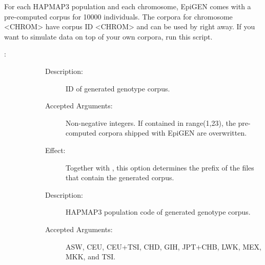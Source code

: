 \documentclass[a4paper,10pt,english]{sphinxhowto}
\begin{document}
For each HAPMAP3 population and each chromosome, EpiGEN comes with a pre-computed corpus for 10000 individuals.
The corpora for chromosome \textless{}CHROM\textgreater{} have corpus ID \textless{}CHROM\textgreater{} and can be used by  right away.
If you want to simulate data on top of your own corpora, run this script.

:

\begin{sphinxVerbatim}[commandchars=\\\{\}]
  \PYG{p}{[} \PYG{p}{]} \PYG{p}{[} \PYG{p}{]}
\end{sphinxVerbatim}
\begin{description}
\item[{}] \leavevmode\begin{description}
\item[{}] \leavevmode\begin{description}
\item[{Description:}] \leavevmode
ID of generated genotype corpus.

\item[{Accepted Arguments:}] \leavevmode
Non-negative integers. If contained in range(1,23), the pre-computed corpora shipped with EpiGEN are overwritten.

\item[{Effect:}] \leavevmode
Together with , this option determines the prefix  of the files
that contain the generated corpus.

\end{description}

\item[{}] \leavevmode\begin{description}
\item[{Description:}] \leavevmode
HAPMAP3 population code of generated genotype corpus.

\item[{Accepted Arguments:}] \leavevmode
ASW, CEU, CEU+TSI, CHD, GIH, JPT+CHB, LWK, MEX, MKK, and TSI.


\end{description}
\end{description}
\end{description}
\end{document}
